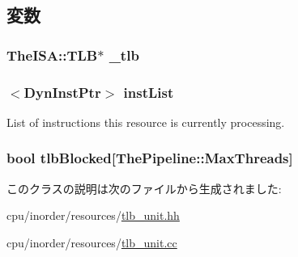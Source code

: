 \subsection{変数}
\hypertarget{classTLBUnit_a5aa23855b427a009f3334c95a146084b}{
\subsubsection[{\_\-tlb}]{\setlength{\rightskip}{0pt plus 5cm}TheISA::TLB$\ast$ {\bf \_\-tlb}}}
\label{classTLBUnit_a5aa23855b427a009f3334c95a146084b}
\hypertarget{classTLBUnit_ae10a391d02ce1ef67ee13cd82b7d46e5}{
\subsubsection[{instList}]{$<${\bf DynInstPtr}$>$ {\bf instList}}}
\label{classTLBUnit_ae10a391d02ce1ef67ee13cd82b7d46e5}
List of instructions this resource is currently processing. \hypertarget{classTLBUnit_a1e5ca2b940e91b19e93867cc549fe65d}{
\subsubsection[{tlbBlocked}]{\setlength{\rightskip}{0pt plus 5cm}bool {\bf tlbBlocked}\mbox{[}{\bf ThePipeline::MaxThreads}\mbox{]}}}
\label{classTLBUnit_a1e5ca2b940e91b19e93867cc549fe65d}


このクラスの説明は次のファイルから生成されました:\begin{DoxyCompactItemize}
\item 
cpu/inorder/resources/\hyperlink{tlb__unit_8hh}{tlb\_\-unit.hh}\item 
cpu/inorder/resources/\hyperlink{tlb__unit_8cc}{tlb\_\-unit.cc}\end{DoxyCompactItemize}
